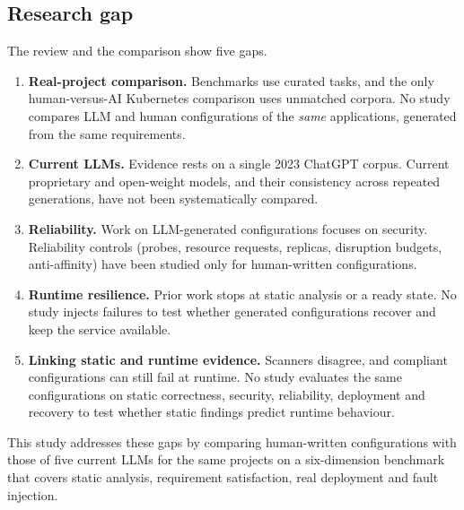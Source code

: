 \subsection{Research gap}\label{sec:lit-gap}

The review and the comparison show five gaps.
\begin{enumerate}
    \item \textbf{Real-project comparison.} Benchmarks use curated tasks, and the only human-versus-AI Kubernetes comparison uses unmatched corpora. No study compares LLM and human configurations of the \emph{same} applications, generated from the same requirements.
    \item \textbf{Current LLMs.} Evidence rests on a single 2023 ChatGPT corpus. Current proprietary and open-weight models, and their consistency across repeated generations, have not been systematically compared.
    \item \textbf{Reliability.} Work on LLM-generated configurations focuses on security. Reliability controls (probes, resource requests, replicas, disruption budgets, anti-affinity) have been studied only for human-written configurations.
    \item \textbf{Runtime resilience.} Prior work stops at static analysis or a ready state. No study injects failures to test whether generated configurations recover and keep the service available.
    \item \textbf{Linking static and runtime evidence.} Scanners disagree, and compliant configurations can still fail at runtime. No study evaluates the same configurations on static correctness, security, reliability, deployment and recovery to test whether static findings predict runtime behaviour.
\end{enumerate}
This study addresses these gaps by comparing human-written configurations with those of five current LLMs for the same projects on a six-dimension benchmark that covers static analysis, requirement satisfaction, real deployment and fault injection.
